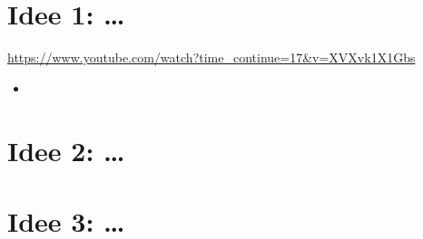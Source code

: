 \documentclass{scrartcl}
\begin{document}
	
%


\section*{Idee 1: \dots}

\lipsum[1-2]

\url{https://www.youtube.com/watch?time_continue=17&v=XVXvk1X1Gbs}

\begin{itemize}
	\item \parencites[35--37]{vive2017}[88--120]{vive2017}[23]{vive2017}
\end{itemize}

\section*{Idee 2: \dots}

\lipsum[3-4]

\section*{Idee 3: \dots}

\lipsum[5-6]

\printbibliography[nottype=online]
\printbibliography[title={Online Referenzen}, type=online]
\end{document}
